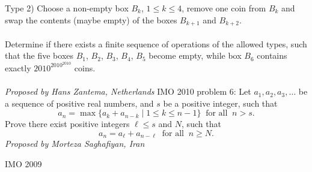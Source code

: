 Type 2) Choose a non-empty box $B_k$, $1\leq k \leq 4$, remove one coin from $B_k$ and swap the contents (maybe empty) of the boxes $B_{k+1}$ and $B_{k+2}$. \\\\
Determine if there exists a finite sequence of operations of the allowed types, such that the five boxes $B_1$, $B_2$, $B_3$, $B_4$, $B_5$ become empty, while box $B_6$ contains exactly $2010^{2010^{2010}}$ coins. \\\\
\textit{Proposed by Hans Zantema, Netherlands} 
IMO 2010 problem 6:  Let $a_1, a_2, a_3, \ldots$ be a sequence of positive real numbers, and $s$ be a positive integer, such that
\[ a_n = \max \{ a_k + a_{n-k} \mid 1 \leq k \leq n-1 \} \ \textrm{ for all } \ n > s. \]
Prove there exist positive integers $\ell \leq s$ and $N$, such that
\[ a_n = a_{\ell} + a_{n - \ell} \ \textrm{ for all } \ n \geq N. \]
\textit{Proposed by Morteza Saghafiyan, Iran} 

IMO 2009 

